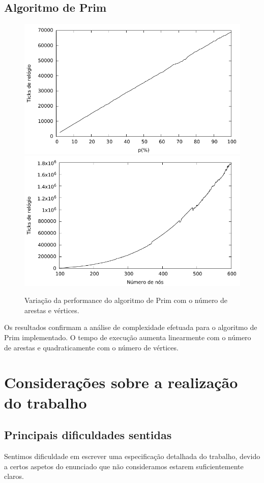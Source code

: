\documentclass[a4paper,12pt,titlepage]{article}
\begin{document}
\subsection{Algoritmo de Prim}
\begin{figure}[!h]
\includegraphics{prim_edges.pdf}
\includegraphics{prim_nodes.pdf}
\caption{Variação da performance do algoritmo de Prim com o número de arestas e vértices.}
\end{figure}
Os resultados confirmam a análise de complexidade efetuada para o algoritmo de Prim implementado. O tempo de execução aumenta linearmente com o número de arestas e quadraticamente com o número de vértices.
\newpage
\section{Considerações sobre a realização do trabalho}
\subsection{Principais dificuldades sentidas}
Sentimos dificuldade em escrever uma especificação detalhada do trabalho, devido a certos aspetos do enunciado que não consideramos estarem suficientemente claros.
\end{document}
